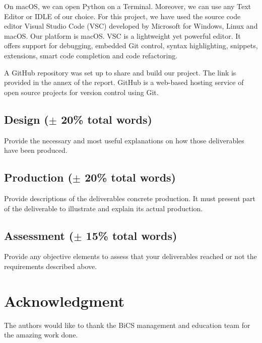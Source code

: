 On macOS, we can open Python on a Terminal. Moreover, we can use any Text Editor or IDLE of our choice. For this project, we have used the source code editor Visual Studio Code (VSC) developed by Microsoft for Windows, Linux and macOS. Our platform is macOS. VSC is a lightweight yet powerful editor. It offers support for debugging, embedded Git control, syntax highlighting, snippets, extensions, smart code completion and code refactoring. 

A GitHub repository was set up to share and build our project. The link is provided in the annex of the report. GitHub is a web-based hosting service of open source projects for version control using Git. 

\subsection{Design ($\pm$ 20\% total words)}
Provide the necessary and most useful explanations on how those deliverables have been produced.
\subsection{Production ($\pm$ 20\% total words)}
Provide descriptions of the deliverables concrete production. It must present part of the deliverable to illustrate and explain its actual production.
\subsection{Assessment ($\pm$ 15\% total words)}
Provide any objective elements to assess that your deliverables reached or not the requirements described above. 
\section*{Acknowledgment}
The authors would like to thank the BiCS management and education team for the amazing work done.